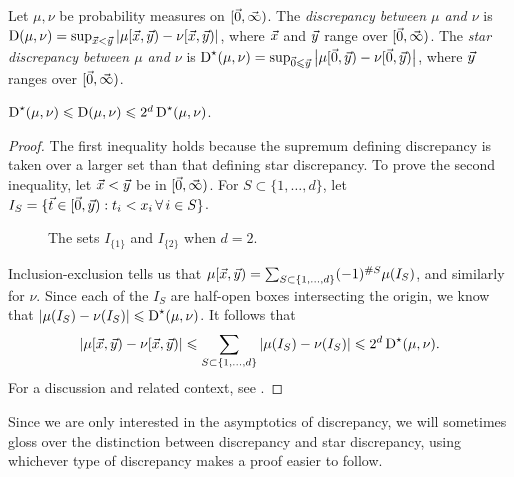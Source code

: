\begin{definition}
Let $\mu, \nu$ be probability measures on $[\vec{0},\vec{\infty})$. The 
\emph{discrepancy between $\mu$ and $\nu$} is 
$\operatorname{D}(\mu,\nu) = \sup_{\vec{x} < \vec{y}} \left| \mu[\vec{x},\vec{y}) - \nu[\vec{x},\vec{y})\right|$, 
where $\vec{x}$ and $\vec{y}$ range over $[\vec{0},\vec{\infty})$.
The \emph{star discrepancy between $\mu$ and $\nu$} is 
$\operatorname{D}^\star(\mu,\nu) = \sup_{\vec{0}\leqslant \vec{y}} \left| \mu[\vec{0},\vec{y}) - \nu[\vec{0},\vec{y})\right|$, 
where $\vec{y}$ ranges over $[\vec{0},\vec{\infty})$. 
\end{definition}

\begin{lemma}\label{lem:star-reg-disc}
$\operatorname{D}^\star(\mu,\nu) \leqslant \operatorname{D}(\mu,\nu) \leqslant 2^d \operatorname{D}^\star(\mu,\nu)$. 
\end{lemma}
\begin{proof}
The first inequality holds because the supremum defining discrepancy is 
taken over a larger set than that defining star discrepancy. To prove the 
second inequality, let $\vec{x}<\vec{y}$ be in $[\vec{0},\vec{\infty})$. For 
$S\subset \{1,\dots,d\}$, let 
$I_S = \{ \vec{t} \in [\vec{0},\vec{y}) : t_i < x_i \,\forall\,i\in S\}$.
\begin{figure}[h]
\caption{The sets $I_{\{1\}}$ and $I_{\{2\}}$ when $d = 2$.}
\centering
{}
\end{figure}
Inclusion-exclusion tells us that 
$\mu[\vec{x},\vec{y}) = \sum_{S\subset \{1,\dots,d\}} (-1)^{\# S} \mu(I_S)$, 
and similarly for $\nu$. Since each of the $I_S$ are half-open boxes 
intersecting the origin, we know that 
$|\mu(I_S) - \nu(I_S)| \leqslant \operatorname{D}^\star(\mu,\nu)$. It follows that 
\[
	|\mu[\vec{x},\vec{y}) - \nu[\vec{x},\vec{y})| \leqslant \sum_{S\subset \{1,\dots,d\}} |\mu(I_S) - \nu(I_S)| \leqslant 2^d \operatorname{D}^\star(\mu,\nu) .
\]
For a discussion and related context, see 
\cite[Ch.~2 Ex.~1.2]{kuipers-niederreiter-1974}. 
\end{proof}

Since we are only interested in the asymptotics of discrepancy, we will 
sometimes gloss over the distinction between discrepancy and star discrepancy, 
using whichever type of discrepancy makes a proof easier to follow. 

